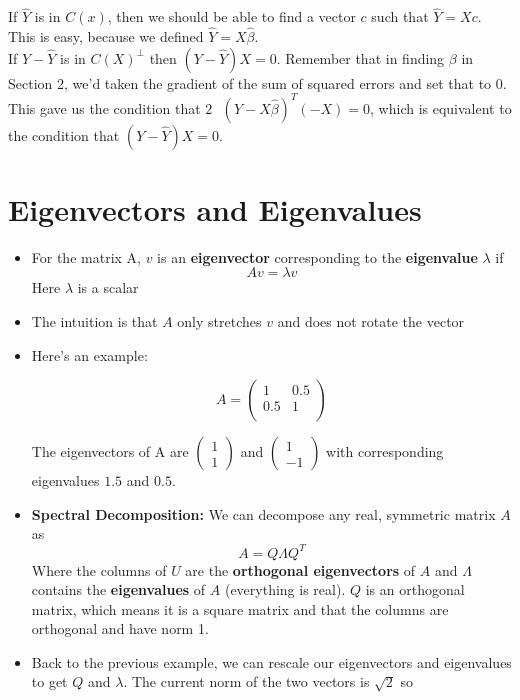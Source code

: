 \documentclass[12pt]{article}
\newcommand{\icol}[1]{%
	\left(\begin{smallmatrix}#1\end{smallmatrix}\right)%
}
\begin{document}
If $\hat{Y}$ is in $C(x)$, then we should be able to find a vector $c$ such that $\hat{Y} = X c$. This is easy, because we defined $\hat{Y} = X \hat{\beta}$. \\

If $Y - \hat{Y}$ is in $C(X)^\perp$ then $(Y - \hat{Y}) X = 0$. Remember that in finding $\beta$ in Section 2, we'd taken the gradient of the sum of squared errors and set that to 0. This gave us the condition that $2 \text{ } (Y-X\hat{\beta})^T (-X) = 0$, which is equivalent to the condition that $(Y - \hat{Y}) X = 0$.

\newpage

\section{Eigenvectors and Eigenvalues}
\begin{itemize}
	\item For the matrix A, $v$ is an \textbf{eigenvector} corresponding to the \textbf{eigenvalue} $\lambda$ if
	$$Av = \lambda v$$ Here $\lambda$ is a scalar
	\item The intuition is that $A$ only stretches $v$ and does not rotate the vector
	\item Here's an example:
	
	\begin{equation*}
	A = \left( 
	\begin{array}{cc}
	1 & 0.5 \\
	0.5 & 1 \\
	\end{array} 
	\right)
	\end{equation*}
	
	The eigenvectors of A are $\icol{1\\1}$ and $\icol{1\\-1}$ with corresponding eigenvalues $1.5$ and $0.5$.
	
	\item \textbf{Spectral Decomposition:} We can decompose any real, symmetric matrix $A$ as $$A = Q \Lambda Q^T$$ Where the columns of $U$ are the \textbf{orthogonal eigenvectors} of $A$ and $\Lambda$ contains the \textbf{eigenvalues} of $A$ (everything is real).  $Q$ is an orthogonal matrix, which means it is a square matrix and that the columns are orthogonal and have norm 1.
	
	\item Back to the previous example, we can rescale our eigenvectors and eigenvalues to get $Q$ and $\lambda$. The current norm of the two vectors is $\sqrt{2}$ so
	

\end{itemize}
\end{document}
